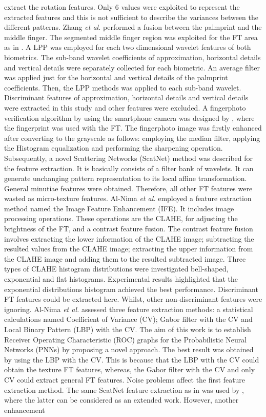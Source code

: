 \documentclass[review]{elsarticle}
\begin{document}
extract the rotation features. Only 6 values were exploited to represent the extracted features and this is not sufficient to describe the variances between the different patterns. Zhang \textit{et al.} \cite{zhang2012hand} performed a fusion between the palmprint and the middle finger. The segmented middle finger region was exploited for the FT area as in \cite{Zhang2010hand}. A LPP was employed for each two dimensional wavelet features of both biometrics. The sub-band wavelet coefficients of approximation, horizontal details and vertical details were separately collected for each biometric. An average filter was applied just for the horizontal and vertical details of the palmprint coefficients. Then, the LPP methods was applied to each sub-band wavelet. Discriminant features of approximation, horizontal details and vertical details were extracted in this study and other features were excluded. A fingerphoto verification algorithm by using the smartphone camera was designed by \cite{sankaran2015Onsmartphone}, where the fingerprint was used with the FT. The fingerphoto image was firstly enhanced after converting to the grayscale as follows: employing the median filter, applying the Histogram equalization and performing the sharpening operation. Subsequently, a novel Scattering Networks (ScatNet) method was described for the feature extraction. It is basically consists of a filter bank of wavelets. It can generate unchanging pattern representation to its local affine transformation. General minutiae features were obtained. Therefore, all other FT features were wasted as micro-texture features. Al-Nima \textit{et al.} \cite{Al-Nima2015Human} employed a feature extraction method named the Image Feature Enhancement (IFE). It includes image processing operations. These operations are the CLAHE, for adjusting the brightness of the FT, and a contrast feature fusion. The contrast feature fusion involves extracting the lower information of the CLAHE image; subtracting the resulted values from the CLAHE image; extracting the upper information from the CLAHE image and adding them to the resulted subtracted image. Three types of CLAHE histogram distributions were investigated bell-shaped, exponential and flat histograms. Experimental results highlighted that the exponential distributions histogram achieved the best performance. Discriminant FT features could be extracted here. Whilst, other non-discriminant features were ignoring. Al-Nima \textit{et al.} \cite{Al-Nima2016ANovel} assessed three feature extraction methods: a statistical calculations named Coefficient of Variance (CV); Gabor filter with the CV and Local Binary Pattern (LBP) with the CV. The aim of this work is to establish Receiver Operating Characteristic (ROC) graphs for the Probabilistic Neural Networks (PNNs) by proposing a novel approach. The best result was obtained by using the LBP with the CV. This is because that the LBP with the CV could obtain the texture FT features, whereas, the Gabor filter with the CV and only CV could extract general FT features. Noise problems affect the first feature extraction method. The same ScatNet feature extraction as in \cite{sankaran2015Onsmartphone} was used by \cite{malhotra2017fingerphoto}, where the latter can be considered as an extended work. However, another enhancement 
\end{document}

